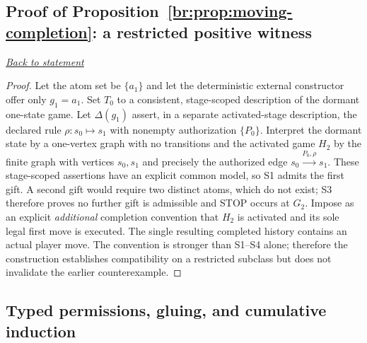 \documentclass[11pt,letterpaper]{article}
\theoremstyle{definition}\newtheorem{definition}[theorem]{Definition}\newtheorem{example}[theorem]{Example}
\theoremstyle{remark}\newtheorem{remark}[theorem]{Remark}
\newcommand{\backlink}[1]{\noindent\hyperref[#1]{\textit{Back to statement}}\par\smallskip}
\begin{document}
\subsection{Proof of Proposition~\ref{br:prop:moving-completion}: a restricted positive witness}\label{br:pr:moving-completion}
\backlink{br:prop:moving-completion}
\begin{proof}
Let the atom set be $\{a_1\}$ and let the deterministic external
constructor offer only $g_1=a_1$. Set $T_0$ to a consistent, stage-scoped
description of the dormant one-state game. Let $\Delta(g_1)$ assert, in a
separate activated-stage description, the declared rule
$\rho:s_0\mapsto s_1$ with nonempty authorization $\{P_0\}$.
Interpret the dormant state by a one-vertex graph with no transitions and
the activated game $H_2$ by the finite graph with vertices $s_0,s_1$
and precisely the authorized edge $s_0\xrightarrow{P_0,\rho}s_1$.
These stage-scoped assertions have an explicit common model, so S1
admits the first gift. A second gift would require two distinct atoms,
which do not exist; S3 therefore proves no further gift is admissible
and STOP occurs at $G_2$. Impose as an explicit \emph{additional}
completion convention that $H_2$ is activated and its sole legal first
move is executed. The single resulting completed history contains an
actual player move. The convention is stronger than S1--S4 alone;
therefore the construction establishes compatibility on a restricted
subclass but does not invalidate the earlier counterexample.
\end{proof}

\subsection*{Typed permissions, gluing, and cumulative induction}
\end{document}
